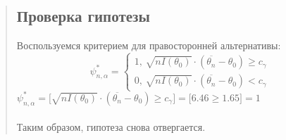 \documentclass{article}
\begin{document}
\begin{quote}
\subsection{Проверка гипотезы}
	Воспользуемся критерием для правосторонней альтернативы: \\
	\Large
	\begin{equation*}
		\psi^{*}_{n, \alpha} = 
 	\begin{cases}
		1\text{, $\sqrt{nI(\theta_0)} \cdot (\overline{\theta_n} - \theta_0) \ge c_{\gamma}$}\\
		0\text{, $\sqrt{nI(\theta_0)} \cdot (\overline{\theta_n} - \theta_0) < c_{\gamma}$}
 	\end{cases}
	\end{equation*}
	$\psi^{*}_{n, \alpha} = \bigl[\sqrt{nI(\theta_0)} \cdot (\overline{\theta_n} - \theta_0) \ge c_{\gamma}\bigr] = \bigl[6.46 \ge 1.65\bigr] = 1$ \\ \\
	\large
	Таким образом, гипотеза снова отвергается.
\end{quote}
\end{document}
